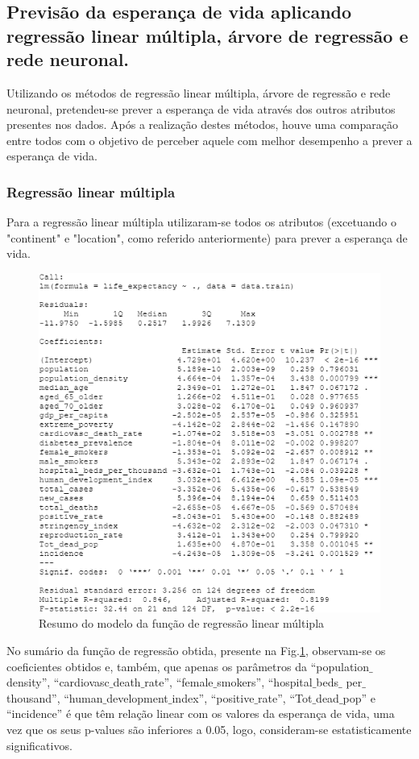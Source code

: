 \documentclass[conference]{IEEEtran}
\begin{document}
\subsection{Previsão da esperança de vida aplicando regressão linear múltipla, árvore de regressão e rede neuronal.}
Utilizando os métodos de regressão linear múltipla, árvore de regressão e rede neuronal, pretendeu-se prever a esperança de vida através dos outros atributos presentes nos dados. Após a realização destes métodos, houve uma comparação entre todos com o objetivo de perceber aquele com melhor desempenho a prever a esperança de vida.

\subsubsection{Regressão linear múltipla}
Para a regressão linear múltipla utilizaram-se todos os atributos (excetuando o "continent" e "location", como referido anteriormente) para prever a esperança de vida.

\begin{figure}[htbp]
\centerline{\includegraphics[width=0.95\columnwidth]{images/04_1.png}}
\caption{Resumo do modelo da função de regressão linear múltipla}
\label{4a}
\end{figure}

No sumário da função de regressão obtida, presente na Fig.\ref{4a}, observam-se os coeficientes obtidos e, também, que apenas os parâmetros da “population$\_$density”, “cardiovasc$\_$death$\_$rate”, “female$\_$smokers”, “hospital$\_$beds$\_$ per$\_$thousand”, “human$\_$development$\_$index”, “positive$\_$rate”, “Tot$\_$dead$\_$pop” e “incidence” é que têm relação linear com os valores da esperança de vida, uma vez que os seus p-values são inferiores a 0.05, logo, consideram-se estatisticamente significativos.
\end{document}

